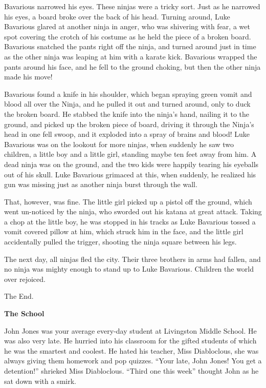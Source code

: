Bavarious narrowed his eyes. These ninjas were a tricky sort. Just
as he narrowed his eyes, a board broke over the back of his head.
Turning around, Luke Bavarious glared at another ninja in anger,
who was shivering with fear, a wet spot covering the crotch of his
costume as he held the piece of a broken board. Bavarious snatched
the pants right off the ninja, and turned around just in time as
the other ninja was leaping at him with a karate kick. Bavarious
wrapped the pants around his face, and he fell to the ground
choking, but then the other ninja made his move!



Bavarious found a knife in his shoulder, which began spraying green
vomit and blood all over the Ninja, and he pulled it out and turned
around, only to duck the broken board. He stabbed the knife into
the ninja's hand, nailing it to the ground, and picked up the
broken piece of board, driving it through the Ninja's head in
one fell swoop, and it exploded into a spray of brains and blood!
Luke Bavarious was on the lookout for more ninjas, when suddenly he
saw two children, a little boy and a little girl, standing maybe
ten feet away from him. A dead ninja was on the ground, and the two
kids were happily tearing his eyeballs out of his skull. Luke
Bavarious grimaced at this, when suddenly, he realized his gun was
missing just as another ninja burst through the wall.



That, however, was fine. The little girl picked up a pistol off the
ground, which went un-noticed by the ninja, who sworded out his
katana at great attack. Taking a chop at the little boy, he was
stopped in his tracks as Luke Bavarious tossed a vomit covered
pillow at him, which struck him in the face, and the little girl
accidentally pulled the trigger, shooting the ninja square between
his legs.



The next day, all ninjas fled the city. Their three brothers in
arms had fallen, and no ninja was mighty enough to stand up to Luke
Bavarious. Children the world over rejoiced.



The End. 
 





{\bf The School}

John Jones was your average every-day student at Livingston Middle
School. He was also very late. He hurried into his classroom for
the gifted students of which he was the smartest and coolest. He
hated his teacher, Miss Diabloclous, she was always giving them
homework and pop quizzes. ``Your late, John Jones! You get a
detention!'' shrieked Miss Diabloclous. ``Third one this
week'' thought John as he sat down with a smirk.



